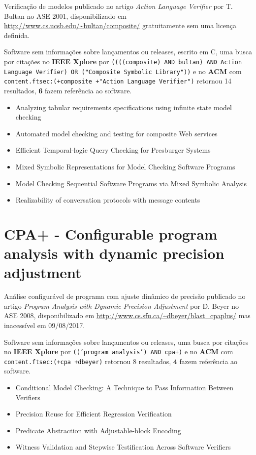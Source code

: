 Verificação de modelos
publicado no artigo {\it Action Language Verifier}
por T. Bultan
no ASE 2001,
disponibilizado em \url{http://www.cs.ucsb.edu/~bultan/composite/}
gratuitamente
sem uma licença definida.

Software sem informações sobre lançamentos ou releases,
escrito em C,
uma busca por citações no {\bf IEEE Xplore} por
\texttt{((((composite) AND bultan) AND Action Language Verifier) OR ("Composite Symbolic Library"))}
e no {\bf ACM} com
\texttt{content.ftsec:(+composite +"Action Language Verifier")}
retornou
14 resultados,
{\bf 6} fazem referência ao software.

\begin{itemize}
\item Analyzing tabular requirements specifications using infinite state model checking
\item Automated model checking and testing for composite Web services
\item Efficient Temporal-logic Query Checking for Presburger Systems
\item Mixed Symbolic Representations for Model Checking Software Programs
\item Model Checking Sequential Software Programs via Mixed Symbolic Analysis
\item Realizability of conversation protocols with message contents
\end{itemize}


\section{CPA+ - Configurable program analysis with dynamic precision adjustment}

Análise configurável de programa com ajuste dinâmico de precisão
publicado no artigo {\it Program Analysis with Dynamic Precision Adjustment}
por D. Beyer
no ASE 2008,
disponibilizado em \url{http://www.cs.sfu.ca/~dbeyer/blast_cpaplus/}
mas inacessível em 09/08/2017.

Software sem informações sobre lançamentos ou releases,
uma busca por citações no {\bf IEEE Xplore} por
\texttt{(('program analysis') AND cpa+)}
e no {\bf ACM} com
\texttt{content.ftsec:(+cpa +dbeyer)}
retornou
8 resultados,
{\bf 4} fazem referência ao software.

\begin{itemize}
\item Conditional Model Checking: A Technique to Pass Information Between Verifiers
\item Precision Reuse for Efficient Regression Verification
\item Predicate Abstraction with Adjustable-block Encoding
\item Witness Validation and Stepwise Testification Across Software Verifiers
\end{itemize}


